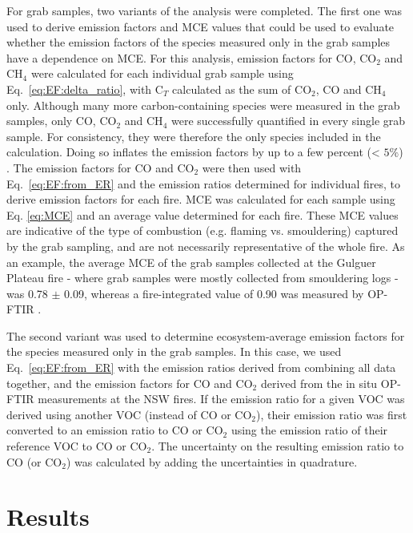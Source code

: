 \documentclass[acp, manuscript]{copernicus}
\begin{document}
For grab samples, two variants of the analysis were completed. The first one was used to derive emission factors and MCE values that could be used to evaluate whether the emission factors of the species measured only in the grab samples have a dependence on MCE. For this analysis, emission factors for CO, CO$_2$ and CH$_4$ were calculated for each individual grab sample using Eq.~\ref{eq:EF:delta_ratio}, with C$_T$ calculated as the sum of CO$_2$, CO and CH$_4$ only. Although many more carbon-containing species were measured in the grab samples, only CO, CO$_2$ and CH$_4$ were successfully quantified in every single grab sample. For consistency, they were therefore the only species included in the calculation. Doing so inflates the emission factors by up to a few percent (< $5 \%$) \citep{Gilman2015,Yokelson2013}. The emission factors for CO and CO$_2$ were then used with Eq.~\ref{eq:EF:from_ER} and the emission ratios determined for individual fires, to derive emission factors for each fire. MCE was calculated for each sample using Eq. \ref{eq:MCE} and an average value determined for each fire. These MCE values are indicative of the type of combustion (e.g. flaming vs. smouldering) captured by the grab sampling, and are not necessarily representative of the whole fire. As an example, the average MCE of the grab samples collected at the Gulguer Plateau fire - where grab samples were mostly collected from smouldering logs - was 0.78 $\pm$ 0.09, whereas a fire-integrated value of 0.90 was measured by OP-FTIR \citep{Paton-Walsh2014}.

The second variant was used to determine ecosystem-average emission factors for the species measured only in the grab samples. In this case, we used Eq.~\ref{eq:EF:from_ER} with the emission ratios derived from combining all data together, and the emission factors for CO and CO$_2$ derived from the in situ OP-FTIR measurements at the NSW fires. If the emission ratio for a given VOC was derived using another VOC (instead of CO or CO$_2$), their emission ratio was first converted to an emission ratio to CO or CO$_2$ using the emission ratio of their reference VOC to CO or CO$_2$. The uncertainty on the resulting emission ratio to CO (or CO$_2$) was calculated by adding the uncertainties in quadrature. 

 
\section{Results}
\end{document}
